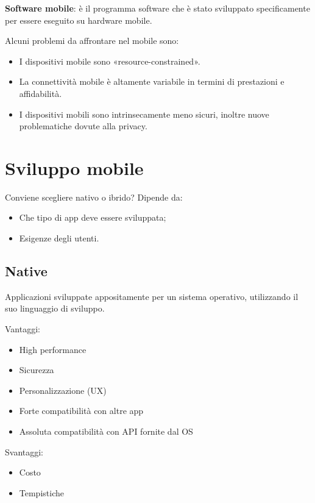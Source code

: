 \textbf{Software mobile}: è il programma software che è stato sviluppato
specificamente per essere eseguito su hardware mobile.

Alcuni problemi da affrontare nel mobile sono:

\begin{itemize}
\item
  I dispositivi mobile sono «resource-constrained».
\item
  La connettività mobile è altamente variabile in termini di prestazioni
  e affidabilità.
\item
  I dispositivi mobili sono intrinsecamente meno sicuri, inoltre nuove
  problematiche dovute alla privacy.
\end{itemize}

\section{Sviluppo mobile}\label{sviluppo-mobile}

Conviene scegliere nativo o ibrido? Dipende da:

\begin{itemize}
\item
  Che tipo di app deve essere sviluppata;
\item
  Esigenze degli utenti.
\end{itemize}

\subsection{Native}\label{native}

Applicazioni sviluppate appositamente per un sistema operativo,
utilizzando il suo linguaggio di sviluppo.

Vantaggi:

\begin{itemize}
\item
  High performance
\item
  Sicurezza
\item
  Personalizzazione (UX)
\item
  Forte compatibilità con altre app
\item
  Assoluta compatibilità con API fornite dal OS
\end{itemize}

Svantaggi:

\begin{itemize}
\item
  Costo
\item
  Tempistiche
\end{itemize}

